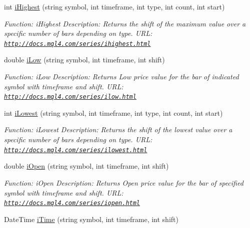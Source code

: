 \begin{DoxyCompactItemize}
int \hyperlink{class_m_q_l4_c_sharp_1_1_base_1_1_m_q_l_base_a88b16c9e96fc636f6558afdd3aac2d30}{i\+Highest} (string symbol, int timeframe, int type, int count, int start)
\begin{DoxyCompactList}\small\item\em Function\+: i\+Highest Description\+: Returns the shift of the maximum value over a specific number of bars depending on type. U\+RL\+: \href{http://docs.mql4.com/series/ihighest.html}{\tt http\+://docs.\+mql4.\+com/series/ihighest.\+html} \end{DoxyCompactList}\item 
double \hyperlink{class_m_q_l4_c_sharp_1_1_base_1_1_m_q_l_base_aff10901c1422e7dbc8977fcec4334146}{i\+Low} (string symbol, int timeframe, int shift)
\begin{DoxyCompactList}\small\item\em Function\+: i\+Low Description\+: Returns Low price value for the bar of indicated symbol with timeframe and shift. U\+RL\+: \href{http://docs.mql4.com/series/ilow.html}{\tt http\+://docs.\+mql4.\+com/series/ilow.\+html} \end{DoxyCompactList}\item 
int \hyperlink{class_m_q_l4_c_sharp_1_1_base_1_1_m_q_l_base_ace0c544ddf23ef6abeb1ab1eb0b4d80e}{i\+Lowest} (string symbol, int timeframe, int type, int count, int start)
\begin{DoxyCompactList}\small\item\em Function\+: i\+Lowest Description\+: Returns the shift of the lowest value over a specific number of bars depending on type. U\+RL\+: \href{http://docs.mql4.com/series/ilowest.html}{\tt http\+://docs.\+mql4.\+com/series/ilowest.\+html} \end{DoxyCompactList}\item 
double \hyperlink{class_m_q_l4_c_sharp_1_1_base_1_1_m_q_l_base_a256be76edcd820beac624f89f210a72c}{i\+Open} (string symbol, int timeframe, int shift)
\begin{DoxyCompactList}\small\item\em Function\+: i\+Open Description\+: Returns Open price value for the bar of specified symbol with timeframe and shift. U\+RL\+: \href{http://docs.mql4.com/series/iopen.html}{\tt http\+://docs.\+mql4.\+com/series/iopen.\+html} \end{DoxyCompactList}\item 
Date\+Time \hyperlink{class_m_q_l4_c_sharp_1_1_base_1_1_m_q_l_base_a0f6583ff87a3914710d177c491f4241e}{i\+Time} (string symbol, int timeframe, int shift)

\end{DoxyCompactItemize}
